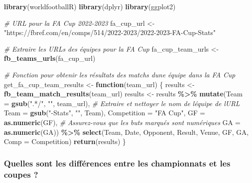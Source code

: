 \documentclass[
]{article}
\newenvironment{Shaded}{\begin{snugshade}}{\end{snugshade}}
\newcommand{\AttributeTok}[1]{\textcolor[rgb]{0.13,0.29,0.53}{#1}}
\newcommand{\CommentTok}[1]{\textcolor[rgb]{0.56,0.35,0.01}{\textit{#1}}}
\newcommand{\ControlFlowTok}[1]{\textcolor[rgb]{0.13,0.29,0.53}{\textbf{#1}}}
\newcommand{\FunctionTok}[1]{\textcolor[rgb]{0.13,0.29,0.53}{\textbf{#1}}}
\newcommand{\NormalTok}[1]{#1}
\newcommand{\OtherTok}[1]{\textcolor[rgb]{0.56,0.35,0.01}{#1}}
\newcommand{\SpecialCharTok}[1]{\textcolor[rgb]{0.81,0.36,0.00}{\textbf{#1}}}
\newcommand{\StringTok}[1]{\textcolor[rgb]{0.31,0.60,0.02}{#1}}
\begin{document}
\begin{Shaded}
\begin{Highlighting}[]
\FunctionTok{library}\NormalTok{(worldfootballR)}
\FunctionTok{library}\NormalTok{(dplyr)}
\FunctionTok{library}\NormalTok{(ggplot2)}

\CommentTok{\# URL pour la FA Cup 2022{-}2023}
\NormalTok{fa\_cup\_url }\OtherTok{\textless{}{-}} \StringTok{"https://fbref.com/en/comps/514/2022{-}2023/2022{-}2023{-}FA{-}Cup{-}Stats"}

\CommentTok{\# Extraire les URLs des équipes pour la FA Cup}
\NormalTok{fa\_cup\_team\_urls }\OtherTok{\textless{}{-}} \FunctionTok{fb\_teams\_urls}\NormalTok{(fa\_cup\_url)}

\CommentTok{\# Fonction pour obtenir les résultats des matchs d\textquotesingle{}une équipe dans la FA Cup}
\NormalTok{get\_fa\_cup\_team\_results }\OtherTok{\textless{}{-}} \ControlFlowTok{function}\NormalTok{(team\_url) \{}
\NormalTok{  results }\OtherTok{\textless{}{-}} \FunctionTok{fb\_team\_match\_results}\NormalTok{(team\_url)}
\NormalTok{  results }\OtherTok{\textless{}{-}}\NormalTok{ results }\SpecialCharTok{\%\textgreater{}\%}
    \FunctionTok{mutate}\NormalTok{(}\AttributeTok{Team =} \FunctionTok{gsub}\NormalTok{(}\StringTok{".*/"}\NormalTok{, }\StringTok{""}\NormalTok{, team\_url),  }\CommentTok{\# Extraire et nettoyer le nom de l\textquotesingle{}équipe de l\textquotesingle{}URL}
           \AttributeTok{Team =} \FunctionTok{gsub}\NormalTok{(}\StringTok{"{-}Stats"}\NormalTok{, }\StringTok{""}\NormalTok{, Team),}
           \AttributeTok{Competition =} \StringTok{"FA Cup"}\NormalTok{,}
           \AttributeTok{GF =} \FunctionTok{as.numeric}\NormalTok{(GF),  }\CommentTok{\# Assurez{-}vous que les buts marqués sont numériques}
           \AttributeTok{GA =} \FunctionTok{as.numeric}\NormalTok{(GA)) }\SpecialCharTok{\%\textgreater{}\%}
    \FunctionTok{select}\NormalTok{(Team, Date, Opponent, Result, Venue, GF, GA, }\AttributeTok{Comp =}\NormalTok{ Competition)}
  \FunctionTok{return}\NormalTok{(results)}
\NormalTok{\}}
\end{Highlighting}
\end{Shaded}

\subsubsection{\texorpdfstring{\textbf{Quelles sont les différences
entre les championnats et les coupes
?}}{Quelles sont les différences entre les championnats et les coupes ?}}\label{quelles-sont-les-diffuxe9rences-entre-les-championnats-et-les-coupes-1}
\end{document}
